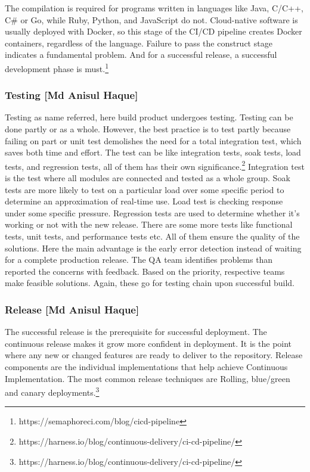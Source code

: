 The compilation is required for programs written in languages like Java, C/C++, C\# or Go, while Ruby, Python, and JavaScript do not. Cloud-native software is usually deployed with Docker, so this stage of the CI/CD pipeline creates Docker containers, regardless of the language. Failure to pass the construct stage indicates a fundamental problem. And for a successful release, a successful development phase is must.\footnote{https://semaphoreci.com/blog/cicd-pipeline}


\subsubsection{Testing [Md Anisul Haque]}
Testing as name referred, here build product undergoes testing. Testing can be done partly or as a whole. However, the best practice is to test partly because failing on part or unit test demolishes the need for a total integration test, which saves both time and effort. The test can be like integration tests, soak tests, load tests, and regression tests, all of them has their own significance.\footnote{https://harness.io/blog/continuous-delivery/ci-cd-pipeline/} Integration test is the test where all modules are connected and tested as a whole group. Soak tests are more likely to test on a particular load over some specific period to determine an approximation of real-time use. Load test is checking response under some specific pressure. Regression tests are used to determine whether it's working or not with the new release. There are some more tests like functional tests, unit tests, and performance tests etc. All of them ensure the quality of the solutions. Here the main advantage is the early error detection instead of waiting for a complete production release. The QA team identifies problems than reported the concerns with feedback. Based on the priority, respective teams make feasible solutions. Again, these go for testing chain upon successful build.


\subsubsection{Release [Md Anisul Haque]}

The successful release is the prerequisite for successful deployment. The continuous release makes it grow more confident in deployment. It is the point where any new or changed features are ready to deliver to the repository. Release components are the individual implementations that help achieve Continuous Implementation. The most common release techniques are Rolling, blue/green and canary deployments.\footnote{https://harness.io/blog/continuous-delivery/ci-cd-pipeline/}

